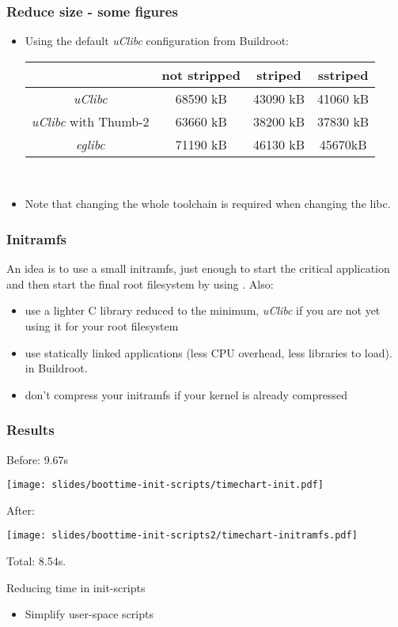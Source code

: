 \begin{frame}
\frametitle{Reduce size - some figures}
\begin{itemize}
	\item Using the default {\em uClibc} configuration from Buildroot:
		\begin{tabular}{| c || c | c | c |} \hline
		& not stripped & striped & sstriped \\ \hline
		{\em uClibc} & 68590 kB & 43090 kB & 41060 kB \\
		{\em uClibc} with Thumb-2 & 63660 kB & 38200 kB & 37830 kB \\
		{\em eglibc} & 71190 kB & 46130 kB & 45670kB \\ \hline
		\end{tabular} \\
	\item Note that changing the whole toolchain is required when changing the libc.
\end{itemize}
\end{frame}

\begin{frame}
\frametitle{Initramfs}
An idea is to use a small initramfs, just enough to start the critical
application and then start the final root filesystem by using
. Also:
\begin{itemize}
	\item use a lighter C library reduced to the minimum,
		{\em uClibc} if you are not yet using it for your root filesystem
	\item use statically linked applications (less CPU overhead, less
		libraries to load).  in Buildroot.
	\item don't compress your initramfs if your kernel is already
		compressed
\end{itemize}
\end{frame}

\begin{frame}
\frametitle{Results}
Before: 9.67s
\begin{center}
    \texttt{[image: slides/boottime-init-scripts/timechart-init.pdf]}
\end{center}
After:
\begin{center}
    \texttt{[image: slides/boottime-init-scripts2/timechart-initramfs.pdf]}
\end{center}
Total: 8.54s.
\end{frame}

\setuplabframe
{Reducing time in init-scripts}
{
\begin{itemize}
\item Simplify user-space scripts
\end{itemize}
}
